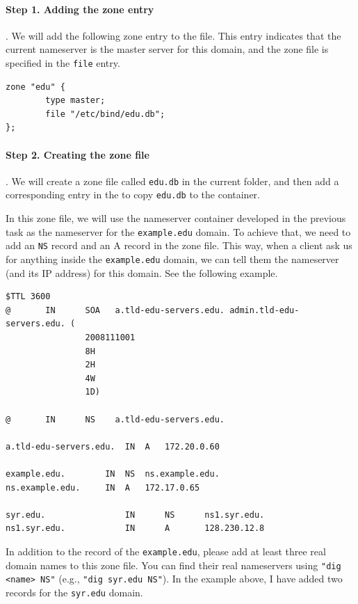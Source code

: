 %

\paragraph{Step 1. Adding the zone entry}. We will
add the following zone entry to the
 file. This entry indicates that the current nameserver
is the master server for this domain, and the zone file is
specified in the \texttt{file} entry.


\begin{lstlisting}
zone "edu" {
        type master;
        file "/etc/bind/edu.db";
};
\end{lstlisting}


\paragraph{Step 2. Creating the zone file}. We will
create a zone file called \texttt{edu.db}
in the current folder, and then add a corresponding
entry in the \dockerfile to copy \texttt{edu.db}
to the container. 


In this zone file, we will use the 
nameserver container developed in the previous task as the nameserver
for the \texttt{example.edu} domain. To achieve that,
we need to add an \texttt{NS} record and an {A} record 
in the zone file. This way, when a client ask us for
anything inside the \texttt{example.edu} domain, we can
tell them the nameserver (and its IP address) for this domain. 
See the following example.


\begin{lstlisting}
$TTL 3600
@       IN      SOA   a.tld-edu-servers.edu. admin.tld-edu-servers.edu. (
                2008111001
                8H
                2H
                4W
                1D)

@       IN      NS    a.tld-edu-servers.edu.

a.tld-edu-servers.edu.	IN 	A	172.20.0.60

example.edu.		IN	NS	ns.example.edu.
ns.example.edu.		IN	A	172.17.0.65

syr.edu.                IN      NS      ns1.syr.edu.
ns1.syr.edu.            IN      A       128.230.12.8
\end{lstlisting}


In addition to the record of the \texttt{example.edu}, please add at least 
three real domain names to this zone file. You can find their real
nameservers using \texttt{"dig <name> NS"} (e.g., \texttt{"dig syr.edu NS"}). 
In the example above, I have added two records for the \texttt{syr.edu} 
domain. 


